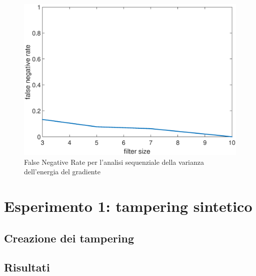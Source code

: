 \begin{figure}[tb]
\centering
\includegraphics[width=13cm]{diagrammi/FNR}
\caption{False Negative Rate per l'analisi sequenziale della varianza dell'energia del gradiente}
\label{fig:FNR}
\end{figure}
\section{Esperimento 1: tampering sintetico}
\label{esp1}
\subsection{Creazione dei tampering}
\subsection{Risultati}

